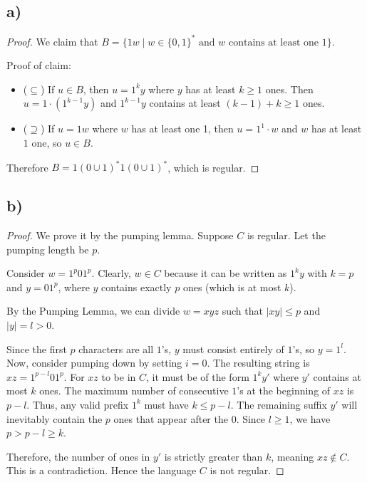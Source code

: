 \documentclass[a4paper, UTF-8]{article}
\theoremstyle{plain}
\begin{document}
\subsection{a)} 
\begin{proof}
We claim that $B = \{1w \mid w \in \{0,1\}^* \text{ and } w \text{ contains at least one } 1\}$.

Proof of claim:
\begin{itemize}
    \item ($\subseteq$) If $u \in B$, then $u = 1^k y$ where $y$ has at least $k \geq 1$ ones. Then $u = 1 \cdot (1^{k-1}y)$ and $1^{k-1}y$ contains at least $(k-1)+k \geq 1$ ones.
    \item ($\supseteq$) If $u = 1w$ where $w$ has at least one 1, then $u = 1^1 \cdot w$ and $w$ has at least $1$ one, so $u \in B$.
\end{itemize}

Therefore $B = 1(0\cup 1)^*1(0\cup 1)^*$, which is regular.
\end{proof}

\subsection{b)} 

\begin{proof}
We prove it by the pumping lemma. Suppose $C$ is regular. Let the pumping length be $p$.

Consider $w = 1^p 0 1^p$. Clearly, $w \in C$ because it can be written as $1^k y$ with $k=p$ and $y=01^p$, where $y$ contains exactly $p$ ones (which is at most $k$).

By the Pumping Lemma, we can divide $w = xyz$ such that $|xy| \leq p$ and $|y| = l > 0$.

Since the first $p$ characters are all $1$'s, $y$ must consist entirely of $1$'s, so $y = 1^l$.
Now, consider pumping down by setting $i=0$. The resulting string is $xz = 1^{p-l} 0 1^p$.
For $xz$ to be in $C$, it must be of the form $1^k y'$ where $y'$ contains at most $k$ ones.
The maximum number of consecutive $1$'s at the beginning of $xz$ is $p-l$. Thus, any valid prefix $1^k$ must have $k \leq p-l$.
The remaining suffix $y'$ will inevitably contain the $p$ ones that appear after the $0$.
Since $l \geq 1$, we have $p > p-l \geq k$. 

Therefore, the number of ones in $y'$ is strictly greater than $k$, meaning $xz \notin C$.
This is a contradiction. Hence the language $C$ is not regular.  
\end{proof}
 
\end{document}
